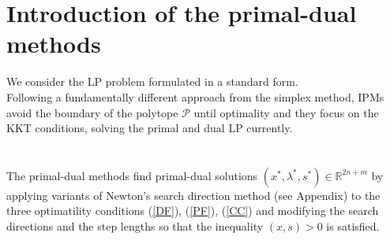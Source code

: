 \documentclass[a4paper,10 pt,titlepage,twoside]{report}
\theoremstyle{plain}
\theoremstyle{definition}
\theoremstyle{remark}
\begin{document}
\section{Introduction of the primal-dual methods}
We consider the LP problem formulated in a standard form. \\
Following a fundamentally different approach from the simplex method, IPMs avoid the boundary of the polytope $\mathcal{P}$ until optimality and they focus on the KKT conditions, solving the primal and dual LP currently.\\
\\
\\
The primal-dual methods find primal-dual solutions $(x^{*},\lambda^{*},s^{*})\in\mathbb{R}^{2n+m}$ by applying variants of Newton's search direction method (see Appendix) to the three optimatility conditions (\ref{DF}), (\ref{PF}), (\ref{CC}) and modifying the search directions and the step lengths so that the inequality $(x,s)>0$ is satisfied.\\
\end{document}

